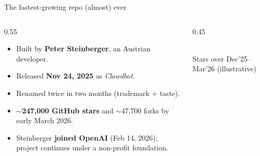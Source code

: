 \documentclass[aspectratio=169,11pt]{beamer}
\begin{document}
\begin{frame}{The fastest-growing repo (almost) ever}
  \begin{columns}[T]
    \begin{column}{0.55\textwidth}
      \begin{itemize}
        \item Built by \textbf{Peter Steinberger}, an Austrian developer.
        \item Released \textbf{Nov 24, 2025} as \emph{Clawdbot}.
        \item Renamed twice in two months (trademark + taste).
        \item $\sim$\textbf{247{,}000 GitHub stars} and $\sim$47{,}700 forks by early March 2026.
        \item Steinberger \textbf{joined OpenAI} (Feb 14, 2026); project continues under a non-profit foundation.
      \end{itemize}
    \end{column}
    \begin{column}{0.45\textwidth}
      \centering
      \\[0.4ex]{\scriptsize\color{clawGray}Stars over Dec'25–Mar'26 (illustrative)}
    \end{column}
  \end{columns}
\end{frame}
\end{document}

